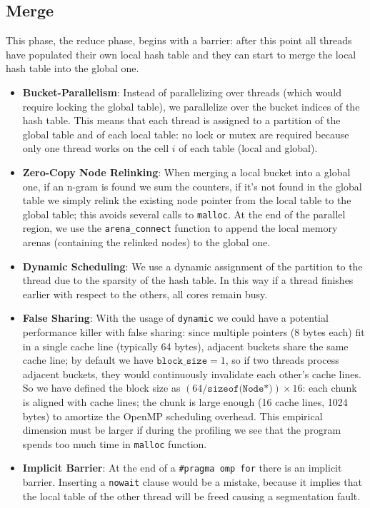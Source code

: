 \subsection{Merge}
This phase, the reduce phase, begins with a barrier: after this point all threads have populated their own local hash table and they can start to merge the local hash table into the global one.
\begin{itemize}
    \item \textbf{Bucket-Parallelism}: Instead of parallelizing over threads (which would require locking the global table), we parallelize over the bucket indices of the hash table. This means that each thread is assigned to a partition of the global table and of each local table: no lock or mutex are required because only one thread works on the cell $i$ of each table (local and global).
    \item \textbf{Zero-Copy Node Relinking}: When merging a local bucket into a global one, if an n-gram is found we sum the counters, if it's not found in the global table we simply relink the existing node pointer from the local table to the global table; this avoids several calls to \texttt{malloc}. At the end of the parallel region, we use the \texttt{arena\_connect} function to append the local memory arenas (containing the relinked nodes) to the global one.
    \item \textbf{Dynamic Scheduling}: We use a dynamic assignment of the partition to the thread due to the sparsity of the hash table. In this way if a thread finishes earlier with respect to the others, all cores remain busy.
    \item \textbf{False Sharing}: With the usage of \texttt{dynamic} we could have a potential performance killer with false sharing: since multiple pointers (8 bytes each) fit in a single cache line (typically 64 bytes), adjacent buckets share the same cache line; by default we have $\texttt{block\_size}=1$, so if two threads process adjacent buckets, they would continuously invalidate each other's cache lines. So we have defined the block size as $(64/\texttt{sizeof(Node*)})\times16$: each chunk is aligned with cache lines; the chunk is large enough (16 cache lines, 1024 bytes) to amortize the OpenMP scheduling overhead. This empirical dimension must be larger if during the profiling we see that the program spends too much time in \texttt{malloc} function.
    \item \textbf{Implicit Barrier}: At the end of a \texttt{\#pragma omp for} there is an implicit barrier. Inserting a \texttt{nowait} clause would be a mistake, because it implies that the local table of the other thread will be freed causing a segmentation fault.
\end{itemize}
